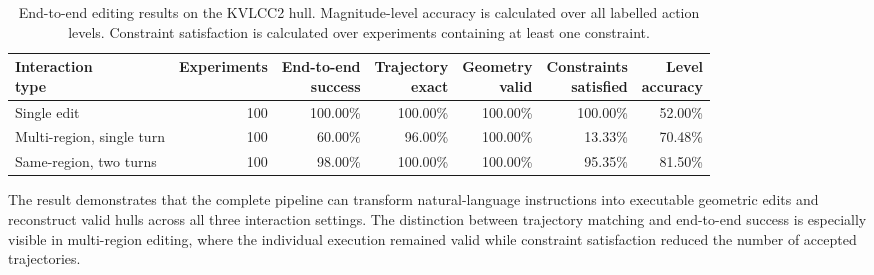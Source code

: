 \documentclass[a4paper,fleqn]{cas-dc}
\begin{document}
\begin{table}[t]
\caption{End-to-end editing results on the KVLCC2 hull. Magnitude-level accuracy
is calculated over all labelled action levels. Constraint satisfaction is
calculated over experiments containing at least one constraint.}
\label{tab:end2end-results}
\centering
\begin{tabular*}{\tblwidth}{@{\extracolsep{\fill}}lrrrrrr@{}}
\toprule
\shortstack{Interaction\\type} & Experiments & \shortstack{End-to-end\\success} & \shortstack{Trajectory\\exact} & \shortstack{Geometry\\valid} & \shortstack{Constraints\\satisfied} & \shortstack{Level\\accuracy} \\
\midrule
Single edit                 & 100 & 100.00\% & 100.00\% & 100.00\% & 100.00\% & 52.00\% \\
Multi-region, single turn  & 100 & 60.00\%  & 96.00\%  & 100.00\% & 13.33\%  & 70.48\% \\
Same-region, two turns     & 100 & 98.00\%  & 100.00\% & 100.00\% & 95.35\%  & 81.50\% \\
\bottomrule
\end{tabular*}
\end{table}

The result demonstrates that the complete pipeline can transform natural-language
instructions into executable geometric edits and reconstruct valid hulls across
all three interaction settings. The distinction between trajectory matching and
end-to-end success is especially visible in multi-region editing, where the
individual execution remained valid while constraint satisfaction reduced the
number of accepted trajectories.
\end{document}
